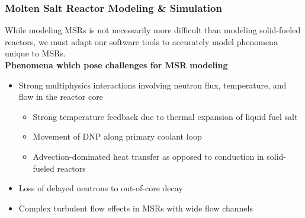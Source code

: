 \begin{frame}
  \frametitle{Molten Salt Reactor Modeling \& Simulation}
  While modeling MSRs is not necessarily more difficult than modeling solid-fueled reactors, we
  must adapt our software tools to accurately model phenomena unique to MSRs.\\

  \textbf{Phenomena which pose challenges for MSR modeling}
  \begin{itemize}
	\item Strong multiphysics interactions involving neutron flux, temperature, and flow in the
      reactor core
	  \begin{itemize}
		\item Strong temperature feedback due to thermal expansion of liquid fuel salt
		\item Movement of \gls{DNP} along primary coolant loop
        \item Advection-dominated heat transfer as opposed to conduction in solid-fueled reactors
	  \end{itemize}
    \item Loss of delayed neutrons to out-of-core decay
    \item Complex turbulent flow effects in MSRs with wide flow channels
  \end{itemize}
\end{frame}

